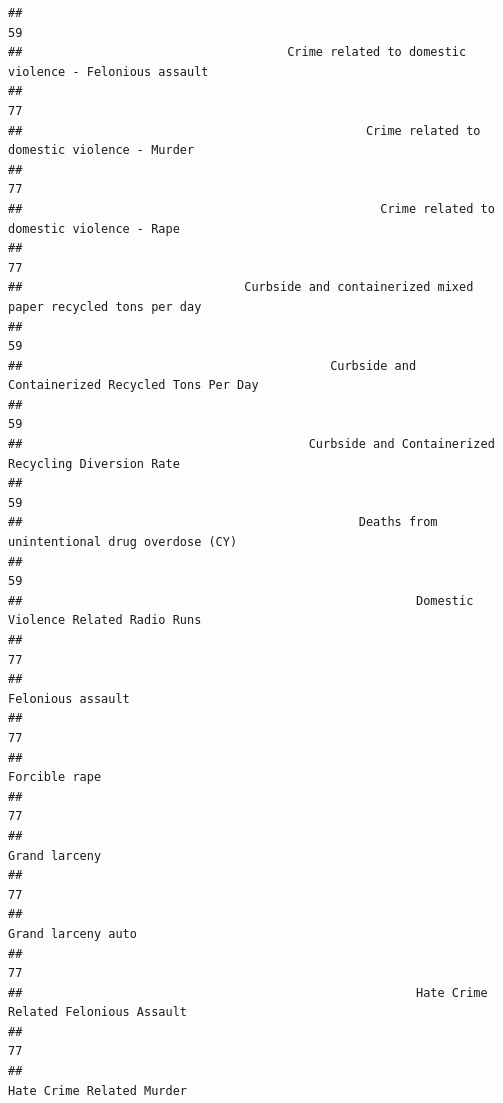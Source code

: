 \documentclass[]{article}
\begin{document}
\begin{verbatim}
##                                                                                         59 
##                                     Crime related to domestic violence - Felonious assault 
##                                                                                         77 
##                                                Crime related to domestic violence - Murder 
##                                                                                         77 
##                                                  Crime related to domestic violence - Rape 
##                                                                                         77 
##                               Curbside and containerized mixed paper recycled tons per day 
##                                                                                         59 
##                                           Curbside and Containerized Recycled Tons Per Day 
##                                                                                         59 
##                                        Curbside and Containerized Recycling Diversion Rate 
##                                                                                         59 
##                                               Deaths from unintentional drug overdose (CY) 
##                                                                                         59 
##                                                       Domestic Violence Related Radio Runs 
##                                                                                         77 
##                                                                          Felonious assault 
##                                                                                         77 
##                                                                              Forcible rape 
##                                                                                         77 
##                                                                              Grand larceny 
##                                                                                         77 
##                                                                         Grand larceny auto 
##                                                                                         77 
##                                                       Hate Crime Related Felonious Assault 
##                                                                                         77 
##                                                                  Hate Crime Related Murder 

\end{verbatim}
\end{document}
